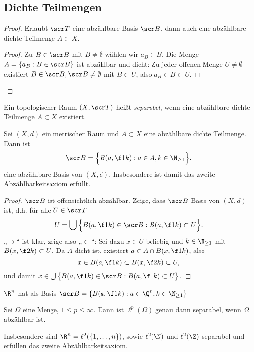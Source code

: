 \subsection{Dichte Teilmengen}

\begin{proof}
	Erlaubt $\scr T$ eine abzählbare Basis $\scr B$, dann auch eine abzählbare dichte Teilmenge $A \subset X$.
	\begin{proof}
		Zu $B \in \scr B$ mit $B \neq \emptyset$ wählen wir $a_B \in B$.
		Die Menge $A = \{a_B : B \in \scr B\}$ ist abzählbar und dicht:
		Zu jeder offenen Menge $U \neq \emptyset$ existiert $B \in \scr B, \scr B \neq \emptyset$ mit $B \subset U$, also $a_B \in B \subset U$.
	\end{proof}
\end{proof}

\begin{df}
	Ein topologischer Raum $(X, \scr T)$ heißt \emph{separabel}, wenn eine abzählbare dichte Teilmenge $A \subset X$ existiert.
\end{df}

\begin{st} \label{st:metric_space_countable_dense_subset_countable_base}
	Sei $(X,d)$ ein metrischer Raum und $A \subset X$ eine abzählbare dichte Teilmenge.
	Dann ist
	\[
		\scr B = \Big\{ B(a, \f 1k) : a \in A, k \in \N_{\ge 1} \Big\}.
	\]
	eine abzählbare Basis von $(X,d)$.
	Insbesondere ist damit das zweite Abzählbarkeitsaxiom erfüllt.
	\begin{proof}
		$\scr B$ ist offensichtlich abzählbar.
		Zeige, dass $\scr B$ Basis von $(X,d)$ ist, d.h. für alle $U \in \scr T$
		\[
			U = \bigcup \Big\{ B(a, \f 1k) \in \scr B : B(a, \f 1k) \subset U \Big\}.
		\]
		„$\supset$“ ist klar, zeige also „$\subset$“:
		Sei dazu $x \in U$ beliebig und $k \in \N_{\ge 1}$ mit $B(x, \f 2k) \subset U$.
		Da $A$ dicht ist, existiert $a \in A \cap B(x, \f 1k)$, also
		\[
			x \in B(a, \f 1k) \subset B(x, \f 2k) \subset U,
		\]
		und damit $x \in \bigcup \big\{ B(a, \f 1k) \in \scr B : B(a, \f 1k) \subset U \big\}$.
	\end{proof}
\end{st}

\begin{ex}
	$\R^n$ hat als Basis $\scr B = \{ B(a, \f 1k) : a \in \Q^n, k \in \N_{\ge 1} \}$
\end{ex}

\begin{st}
	Sei $\Omega$ eine Menge, $1 \le p \le \infty$.
	Dann ist $\ell^p(\Omega)$ genau dann separabel, wenn $\Omega$ abzählbar ist.

	Insbesondere sind $\R^n = \ell^2(\{1, \dotsc, n\})$, sowie $\ell^2(\N)$ und $\ell^2(\Z)$ separabel und erfüllen das zweite Abzählbarkeitsaxiom.
\end{st}


